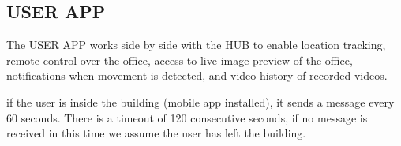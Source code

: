 \subsection{USER APP}


The USER APP works side by side with the HUB to enable location tracking, remote control over the office, access to live image preview of the office, notifications when movement is detected, and video history of recorded videos.







if the user is inside the building (mobile app installed), it sends a message every 60 seconds. There is a timeout of 120 consecutive seconds, if no message is received in this time we assume the user has left the building.





